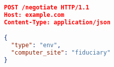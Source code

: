 

\begin{lstlisting}[language=json,firstnumber=1]
POST /negotiate HTTP/1.1
Host: example.com
Content-Type: application/json

{
  "type": "env",
  "computer_site": "fiduciary"
}
\end{lstlisting}